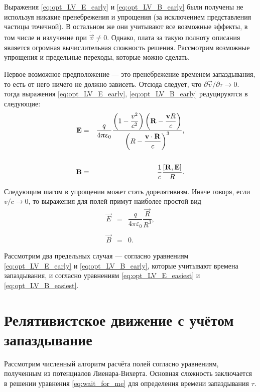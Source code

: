 Выражения \eqref{eq:opt_LV_E_early} и \eqref{eq:opt_LV_B_early} были получены не используя никакие пренебрежения и упрощения (за исключением представления частицы точечной). В остальном же они учитывают все возможные эффекты, в том числе и излучение при $\dot{\vec{v}} \neq 0$. Однако, плата за такую полноту описания является огромная вычислительная сложность решения. Рассмотрим возможные упрощения и предельные переходы, которые можно сделать.

Первое возможное предположение --- это пренебрежение временем запаздывания, то есть от него ничего не должно зависеть. Отсюда следует, что $\partial \vec{v}/\partial \tau \to 0$.
тогда выражения \eqref{eq:opt_LV_E_early}, \eqref{eq:opt_LV_B_early} редуцируются в следующие:
\begin{eqnarray}
	\mathbf{E} &=& \dfrac{q}{4 \uppi \upvarepsilon_0} \dfrac{\left( 1 - \dfrac{v^2}{c^2} \right) \left( \mathbf{R} - \dfrac{\mathbf{v} R}{c}  \right) }{\left( R - \dfrac{\mathbf{v} \cdot \mathbf{ R}}{c} \right)^3} , \\ \nonumber \\
	\label{eq:opt_LV_E_easy}
	\mathbf{B} &=& \dfrac{1}{c} \frac{\left[ \mathbf{{R}},\mathbf{{E}} \right]}{R}.
	\label{eq:opt_LV_B_easy}
\end{eqnarray}

Следующим шагом в упрощении может стать дорелятивизм. Иначе говоря, если
$v/c \to 0$,
то выражения для полей примут наиболее простой вид
\begin{eqnarray}
\vec{E} &=& \dfrac{q}{4 \pi \varepsilon_0}  \dfrac{ \vec{R} }{R^3}, \label{eq:opt_LV_E_easiest} \\ \nonumber \\
\vec{B} &=& 0.
\label{eq:opt_LV_B_easiest}
\end{eqnarray}


Рассмотрим два предельных случая --- согласно уравнениям \eqref{eq:opt_LV_E_early} и \eqref{eq:opt_LV_B_early}, которые учитывают времена запаздывания, и согласно уравнениям \eqref{eq:opt_LV_E_easiest} и \eqref{eq:opt_LV_B_easiest}.

\section{Релятивистское движение с учётом запаздывание}

Рассмотрим численный алгоритм расчёта полей согласно уравнениям, полученным из потенциалов Лиенара-Вихерта. Основная сложность заключается в решении уравнения \eqref{eq:wait_for_me} для определения времени запаздывания $\tau$.

